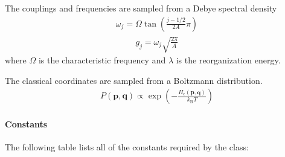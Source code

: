 \documentclass[letterpaper,10pt,english]{sphinxmanual}
\begin{document}
\sphinxAtStartPar
The couplings and frequencies are sampled from a Debye spectral density
\begin{equation*}
\begin{split}\omega_{j} = \Omega\tan\left(\frac{j - 1/2}{2A}\pi\right)\end{split}
\end{equation*}\begin{equation*}
\begin{split}g_{j} = \omega_{j}\sqrt{\frac{2\lambda}{A}}\end{split}
\end{equation*}
\sphinxAtStartPar
where \(\Omega\) is the characteristic frequency and \(\lambda\) is the reorganization energy.

\sphinxAtStartPar
The classical coordinates are sampled from a Boltzmann distribution.
\begin{equation*}
\begin{split}P(\boldsymbol{p},\boldsymbol{q}) \propto \exp\left(-\frac{H_{\mathrm{c}}(\boldsymbol{p},\boldsymbol{q})}{k_{\mathrm{B}}T}\right)\end{split}
\end{equation*}

\paragraph{Constants}
\label{\detokenize{user_guide/models/fmo_model:constants}}
\sphinxAtStartPar
The following table lists all of the constants required by the  class:
\end{document}
